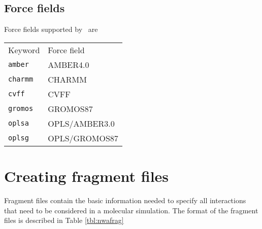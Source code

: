 \subsection{Force fields}
\label{sec:nwaforcefields}
Force fields supported by \nwargos\ are
\begin{center}
\begin{tabular}{ll}
\hline
Keyword      & Force field   \\
{\tt amber}  & AMBER4.0      \\
{\tt charmm} & CHARMM        \\
{\tt cvff}   & CVFF          \\
{\tt gromos} & GROMOS87      \\
{\tt oplsa}  & OPLS/AMBER3.0 \\
{\tt oplsg}  & OPLS/GROMOS87 \\
\hline
\end{tabular}
\end{center}  

\section{Creating fragment files}
Fragment files contain the basic information needed to specify all
interactions that need to be considered in a molecular simulation.
The format of the fragment files is described in Table \ref{tbl:nwafrag}


